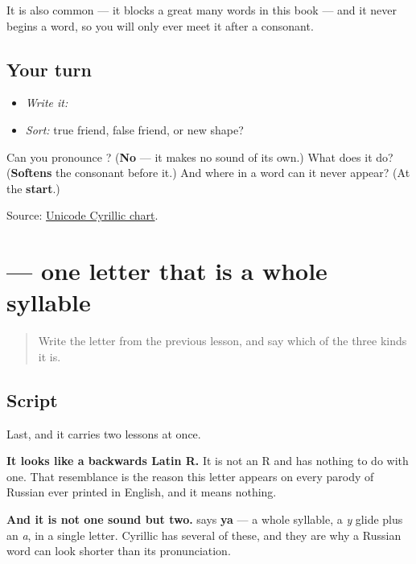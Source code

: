 It is also common — it blocks a great many words in this book — and it never begins a word, so you will only ever meet it after a consonant.

\subsection*{Your turn}
\begin{itemize}
\raggedright
  \item \emph{Write it:} 
  \item \emph{Sort:} true friend, false friend, or new shape?
\end{itemize}

\begin{tcolorbox}[breakable,colback=teal!4,colframe=teal!35!black,title={Before you move on}]
Can you pronounce \textbf{}? (\textbf{No} — it makes no sound of its own.) What does it do? (\textbf{Softens} the consonant before it.) And where in a word can it never appear? (At the \textbf{start}.)

Source: \href{https://www.unicode.org/charts/PDF/U0400.pdf}{Unicode Cyrillic chart}.
\end{tcolorbox}
\section[\texorpdfstring{\ru{Я} (ya)}{Я (ya)}]{ — one letter that is a whole syllable}

\label{lesson:RU-W06-ya}



\begin{quote}
Write the letter from the previous lesson, and say which of the three kinds it is.
\end{quote}

\subsection*{Script}
\begin{quote}
   
\end{quote}

Last, and it carries two lessons at once.

\textbf{It looks like a backwards Latin R.} It is not an R and has nothing to do with one. That resemblance is the reason this letter appears on every parody of Russian ever printed in English, and it means nothing.

\textbf{And it is not one sound but two.} \textbf{} says \textbf{ya} — a whole syllable, a \emph{y} glide plus an \emph{a}, in a single letter. Cyrillic has several of these, and they are why a Russian word can look shorter than its pronunciation.

